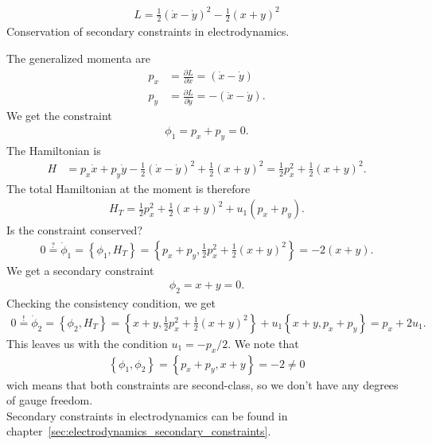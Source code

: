 \begin{exercise}
\begin{align*}
L = \frac{1}{2} (\dot{x} - \dot{y})^2 - \frac{1}{2} (x + y)^2
\end{align*}
Conservation of secondary constraints in electrodynamics.
\end{exercise}
\begin{solution}
The generalized momenta are
\begin{align*}
p_x &= \frac{\partial L}{\partial \dot{x}} = (\dot{x} - \dot{y}) \\
p_y &= \frac{\partial L}{\partial \dot{y}} = - (\dot{x} - \dot{y}).
\end{align*}
We get the constraint 
\begin{align*}
\phi_1 = p_x + p_y = 0.
\end{align*}
The Hamiltonian is
\begin{align*}
H &= p_x \dot{x} + p_y \dot{y} - \frac{1}{2} (\dot{x} - \dot{y})^2 + \frac{1}{2} (x + y)^2 = \frac{1}{2} p_x^2 + \frac{1}{2} (x + y)^2.
\end{align*}
The total Hamiltonian at the moment is therefore
\begin{align*}
H_T = \frac{1}{2} p_x^2 + \frac{1}{2} (x + y)^2 + u_1 (p_x + p_y).
\end{align*}
Is the constraint conserved?
\begin{align*}
0 \overset{?}{=} \dot{\phi}_1 = \left \{ \phi_1,H_T \right \} = \left \{ p_x + p_y,\frac{1}{2} p_x^2 + \frac{1}{2} (x + y)^2 \right \} = - 2 (x + y).
\end{align*}
We get a secondary constraint 
\begin{align*}
\phi_2 = x + y = 0.
\end{align*}
Checking the consistency condition, we get
\begin{align*}
0 \overset{!}{=} \dot{\phi}_2 = \left \{ \phi_2,H_T \right \} = \left \{ x + y,\frac{1}{2} p_x^2 + \frac{1}{2} (x + y)^2 \right \} + u_1 \left \{ x + y,p_x + p_y \right \} = p_x + 2 u_1.
\end{align*}
This leaves us with the condition $u_1 = - p_x / 2$. We note that 
\begin{align*}
\left \{ \phi_1,\phi_2 \right \} = \left \{ p_x + p_y,x + y \right \} = - 2 \neq 0
\end{align*}
wich means that both constraints are second-class, so we don't have any degrees of gauge freedom. \\

Secondary constraints in electrodynamics can be found in chapter~\vref{sec:electrodynamics_secondary_constraints}.
\end{solution}




